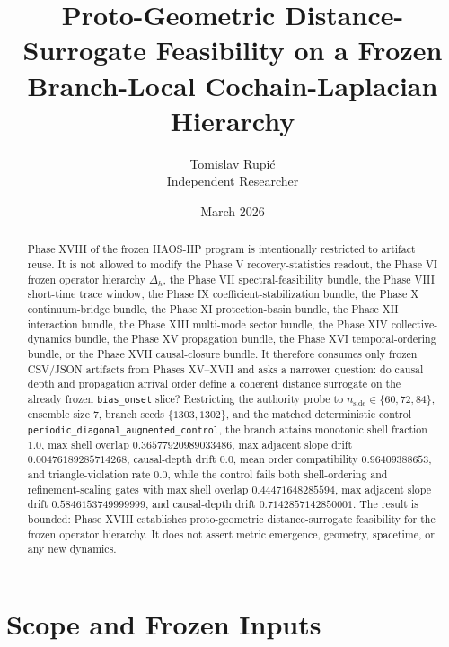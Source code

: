 \documentclass[11pt]{article}
\title{Proto-Geometric Distance-Surrogate Feasibility on a Frozen Branch-Local Cochain-Laplacian Hierarchy}
\author{Tomislav Rupi\'c \\ Independent Researcher}
\date{March 2026}
\begin{document}
\maketitle

\begin{abstract}
Phase XVIII of the frozen HAOS-IIP program is intentionally restricted to artifact reuse. It is not allowed to modify the Phase V recovery-statistics readout, the Phase VI frozen operator hierarchy $\Delta_h$, the Phase VII spectral-feasibility bundle, the Phase VIII short-time trace window, the Phase IX coefficient-stabilization bundle, the Phase X continuum-bridge bundle, the Phase XI protection-basin bundle, the Phase XII interaction bundle, the Phase XIII multi-mode sector bundle, the Phase XIV collective-dynamics bundle, the Phase XV propagation bundle, the Phase XVI temporal-ordering bundle, or the Phase XVII causal-closure bundle. It therefore consumes only frozen CSV/JSON artifacts from Phases XV--XVII and asks a narrower question: do causal depth and propagation arrival order define a coherent distance surrogate on the already frozen \texttt{bias\_onset} slice? Restricting the authority probe to $n_{\mathrm{side}} \in \{60,72,84\}$, ensemble size $7$, branch seeds $\{1303,1302\}$, and the matched deterministic control \texttt{periodic\_diagonal\_augmented\_control}, the branch attains monotonic shell fraction $1.0$, max shell overlap $0.36577920989033486$, max adjacent slope drift $0.00476189285714268$, causal-depth drift $0.0$, mean order compatibility $0.96409388653$, and triangle-violation rate $0.0$, while the control fails both shell-ordering and refinement-scaling gates with max shell overlap $0.44471648285594$, max adjacent slope drift $0.5846153749999999$, and causal-depth drift $0.7142857142850001$. The result is bounded: Phase XVIII establishes proto-geometric distance-surrogate feasibility for the frozen operator hierarchy. It does not assert metric emergence, geometry, spacetime, or any new dynamics.
\end{abstract}

\section{Scope and Frozen Inputs}
\end{document}
